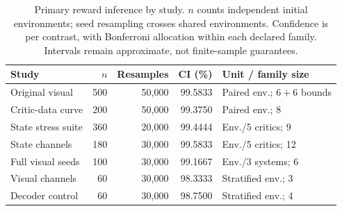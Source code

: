 \begin{table}[H]\centering\small
\caption{Primary reward inference by study. $n$ counts independent initial environments; seed resampling crosses shared environments. Confidence is per contrast, with Bonferroni allocation within each declared family. Intervals remain approximate, not finite-sample guarantees.}\label{s-tab:inference}
\setlength{\tabcolsep}{3pt}
\begin{tabular}{lrrrl}\toprule Study & $n$ & Resamples & CI (\%) & Unit / family size\\\midrule
Original visual & 500 & 50,000 & 99.5833 & Paired env.; $6+6$ bounds\\
Critic-data curve & 200 & 50,000 & 99.3750 & Paired env.; 8\\
State stress suite & 360 & 20,000 & 99.4444 & Env./5 critics; 9\\
State channels & 180 & 30,000 & 99.5833 & Env./5 critics; 12\\
Full visual seeds & 100 & 30,000 & 99.1667 & Env./3 systems; 6\\
Visual channels & 60 & 30,000 & 98.3333 & Stratified env.; 3\\
Decoder control & 60 & 30,000 & 98.7500 & Stratified env.; 4\\\bottomrule
\end{tabular}
\end{table}
